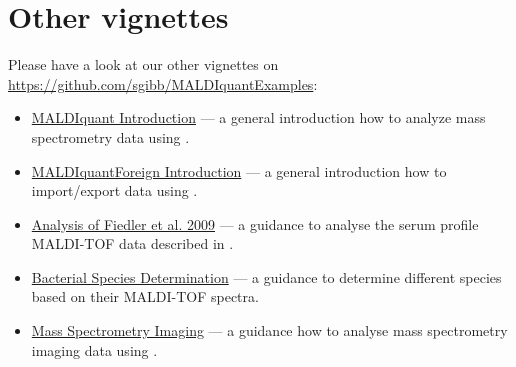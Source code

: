 \section{Other vignettes}

Please have a look at our other vignettes on
\url{https://github.com/sgibb/MALDIquantExamples}:
\begin{itemize}
  \item
    \href{http://cran.r-project.org/web/packages/MALDIquant/vignettes/MALDIquant-intro.pdf}{MALDIquant
    Introduction} --- a general introduction how to analyze mass spectrometry
    data using \Mq{}.
  \item
    \href{http://cran.r-project.org/web/packages/MALDIquantForeign/vignettes/MALDIquantForeign-intro.pdf}{MALDIquantForeign
    Introduction} --- a general introduction how to import/export data using
    \MqF{}.
  \item
    \href{https://github.com/sgibb/MALDIquantExamples/blob/master/inst/doc/fiedler2009.pdf?raw=true}{Analysis
    of Fiedler et al. 2009} --- a guidance to analyse the serum profile
    MALDI-TOF data described in \citet{Fiedler2009}.
  \item
    \href{https://github.com/sgibb/MALDIquantExamples/blob/master/inst/doc/species.pdf?raw=true}{Bacterial
    Species Determination} --- a guidance to determine different species based
    on their MALDI-TOF spectra.
  \item
    \href{https://github.com/sgibb/MALDIquantExamples/blob/master/inst/doc/nyakas2013.pdf?raw=true}{Mass
    Spectrometry Imaging} --- a guidance how to analyse mass spectrometry
    imaging data using \Mq{}.
\end{itemize}
